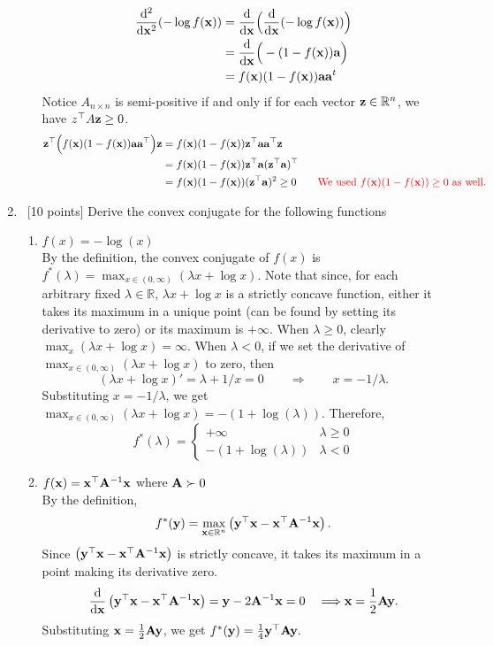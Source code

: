\documentclass[12pt, fullpage,letterpaper]{article}
\def\red{\color{red}}
\def\blackblue{\color{black!40!blue}}
\begin{document}
\begin{enumerate}
\begin{enumerate}
{\begin{align*}
\frac{{\rm d}^2 }{{\rm d} {\bf x}^2} (-\log f({\bf x})) 
& = \frac{{\rm d} }{{\rm d} {\bf x}} \Big(\frac{{\rm d} }{{\rm d} {\bf x}} (-\log f({\bf x}))\Big)\\
& = \frac{{\rm d} }{{\rm d} {\bf x}} \Big(-(1-f({\bf x})){\bf a} \Big)\\
& = f({\bf x})(1-f({\bf x})){\bf a} {\bf a}^t
\end{align*}
Notice $A_{n\times n}$ is semi-positive if and only if for each vector ${\bf z}\in\mathbb{R}^n$, we have $z^\top A {\bf z}\geq 0$.
\begin{align*}
\z^\top \Big(f(\x)(1-f(\x))\a \a^\top\Big) \z
& = f(\x)(1-f(\x)) \z^\top\a \a ^\top\z\\
& =  f(\x)(1-f(\x)) \z^\top\a( \z^\top \a )^\top\\
& = f(\x)(1-f(\x))  (\z^\top\a)^2 \geq 0 \quad\quad \mbox{\red We used $f(\x)(1-f(\x))\geq 0$ as well.}
\end{align*}
}
\end{enumerate}
\item ~[10 points] Derive the convex conjugate for the following functions
\begin{enumerate}
\item $f(x) = -\log(x)$\\
{\blackblue\noindent 
By the definition, the convex conjugate of $f(x)$ is 
$f^*(\lambda) = \displaystyle\max_{x\in (0,\infty)} \left(\lambda x + \log x\right)$. 
Note that since, for each arbitrary fixed $\lambda\in \mathbb{R}$,  $\lambda x + \log x$ is a strictly concave function, either it takes its maximum in a unique point (can be found by setting its derivative to zero) or its maximum is $+\infty$. 
When $\lambda \geq 0$, clearly $\displaystyle\max_{x} \left(\lambda x + \log x\right) = \infty$. 
When $\lambda < 0$, if we set the derivative of $\displaystyle\max_{x\in (0,\infty)} \left(\lambda x + \log x\right)$ to zero, then
$$\left(\lambda x + \log x\right)' = \lambda + 1/x = 0\quad\quad \Longrightarrow\quad\quad x = -1/\lambda.$$
Substituting $x = -1/\lambda$, we get 
$\displaystyle\max_{x\in (0,\infty)} \left(\lambda x + \log x\right) = -(1 + \log(\lambda)).$
Therefore, 
$$f^*(\lambda) = \left\{
\begin{array}{ll}
+\infty & \lambda\geq 0\\
-(1 + \log(\lambda)) & \lambda< 0
\end{array}\right.$$
}
\item $f({\bf x}) = {\bf x}^\top {\bf A}^{-1} {\bf x}$ where ${\bf A} \succ 0$\\
{\blackblue\noindent 
By the definition, 
$$f^*({\bf y}) = \displaystyle\max_{{\bf x}\in\mathbb{R}^n} \left({\bf y}^\top {\bf x} - {\bf x}^\top{\bf A}^{-1}{\bf x}\right).$$
Since $\left({\bf y}^\top {\bf x} - {\bf x}^\top{\bf A}^{-1}{\bf x}\right)$ is strictly concave, it takes its maximum in a point making its derivative zero. 
$$\frac{{\rm d}}{{\rm d} {\bf x}} \left({\bf y}^\top {\bf x} - {\bf x}^\top{\bf A}^{-1}{\bf x}\right) = {\bf y}- 2 {\bf A}^{-1}{\bf x} = 0 \quad \Longrightarrow {\bf x} = \frac{1}{2} {\bf A}{\bf y}.$$
Substituting ${\bf x} = \frac{1}{2} {\bf A}{\bf y}$, we get 
$f^*({\bf y}) =  \frac{1}{4}{\bf y}^\top {\bf A}{\bf y}.$
}
\end{enumerate}


\end{enumerate}
\end{document}
